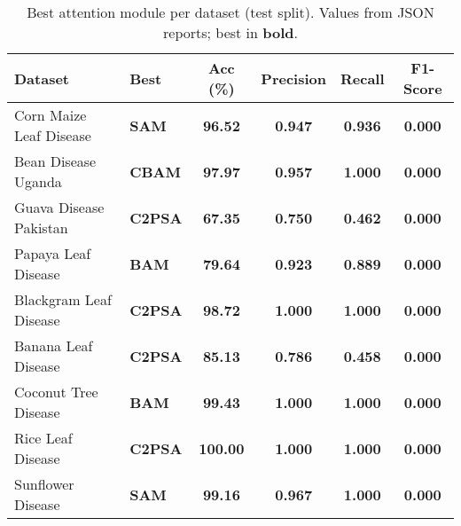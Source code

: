 \begin{table}[t]
\centering
\caption{Best attention module per dataset (test split). Values from JSON reports; best in \textbf{bold}.}
\label{tab:best_attention_summary}
\begin{tabular}{l l c c c c}
\toprule
\textbf{Dataset} & \textbf{Best} & \textbf{Acc (\%)} & \textbf{Precision} & \textbf{Recall} & \textbf{F1-Score}\\
\midrule
Corn Maize Leaf Disease & \textbf{SAM} & \textbf{96.52} & \textbf{0.947} & \textbf{0.936} & \textbf{0.000}\\
Bean Disease Uganda & \textbf{CBAM} & \textbf{97.97} & \textbf{0.957} & \textbf{1.000} & \textbf{0.000}\\
Guava Disease Pakistan & \textbf{C2PSA} & \textbf{67.35} & \textbf{0.750} & \textbf{0.462} & \textbf{0.000}\\
Papaya Leaf Disease & \textbf{BAM} & \textbf{79.64} & \textbf{0.923} & \textbf{0.889} & \textbf{0.000}\\
Blackgram Leaf Disease & \textbf{C2PSA} & \textbf{98.72} & \textbf{1.000} & \textbf{1.000} & \textbf{0.000}\\
Banana Leaf Disease & \textbf{C2PSA} & \textbf{85.13} & \textbf{0.786} & \textbf{0.458} & \textbf{0.000}\\
Coconut Tree Disease & \textbf{BAM} & \textbf{99.43} & \textbf{1.000} & \textbf{1.000} & \textbf{0.000}\\
Rice Leaf Disease & \textbf{C2PSA} & \textbf{100.00} & \textbf{1.000} & \textbf{1.000} & \textbf{0.000}\\
Sunflower Disease & \textbf{SAM} & \textbf{99.16} & \textbf{0.967} & \textbf{1.000} & \textbf{0.000}\\
\bottomrule
\end{tabular}
\end{table}